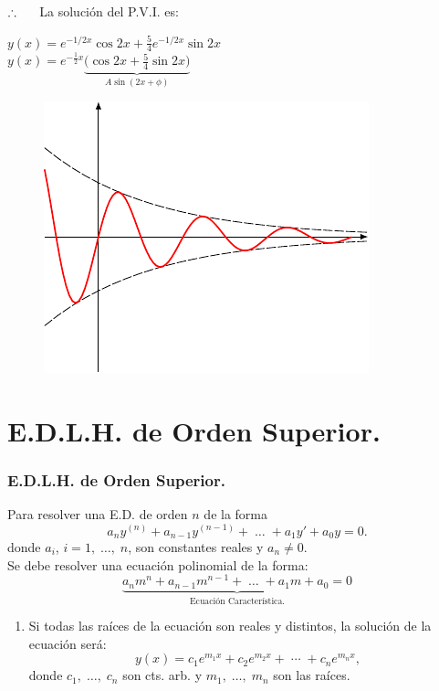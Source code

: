 \documentclass{beamer}
\begin{document}
\begin{frame}[t]
	\begin{alertblock}{}
		\(\therefore \hspace{5mm}\) La solución del P.V.I. es:
		\begin{center}
			\color{red} \underline{\color{black} \(y(x) = e^{-1/2x} \cos 2x+ \frac 54 e^{-1/2x} \sin 2x\)} \\[2mm]
			\color{black} \(y(x) = e^{- \frac 12 x} \underbrace{\big(\cos 2x+ \frac 54 \sin 2x\big)} _{A \sin (2x+ \phi)}\) 
		\end{center} \vspace{-5mm}
		\begin{figure}[hbtp!]
			\centering
			\includegraphics[width= 0.5 \linewidth]{IMAGENES/1/tikz.pdf}
		\end{figure}
	\end{alertblock}
\end{frame}


\section{E.D.L.H. de Orden Superior.} %
\begin{frame}[t]
	\frametitle{E.D.L.H. de Orden Superior.}
	\begin{block}{}
		Para resolver una E.D. de orden \(n\) de la forma
		\[
			a_ny^{(n)} +a_{n-1} y^{(n-1)} + \;\ldots\; + a_1y' +a_0y =0.
		\]
		donde \(a_i\), \(i=1, \;\ldots,\; n\), son constantes reales y \(a_n \ne 0\). \\[2mm]
		Se debe resolver una ecuación polinomial de la forma:
		\[
			\underbrace{a_nm^n+a_{n-1} m^{n-1} + \;\ldots\; + a_1m+a_0=0} _\text{Ecuación Característica.}
		\]
		\begin{enumerate}
			\item Si todas las raíces de la ecuación son reales y distintos, la solución de la ecuación será:
				\[
					y(x) = c_1e^{m_1x} + c_2e^{m_2x} + \;\cdots\; + c_ne^{m_nx},
				\]
				donde \(c_1, \;\ldots,\; c_n\) son cts. arb. y \(m_1, \;\ldots,\; m_n\) son las raíces.
		\end{enumerate}
	\end{block}
\end{frame}
\end{document}

